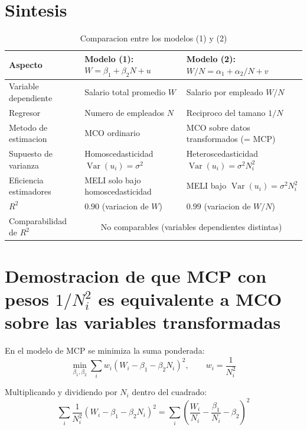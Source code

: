\documentclass[12pt, letterpaper]{article}
\theoremstyle{remark}
\newcommand{\Var}{\operatorname{Var}}
\begin{document}
\section{Sintesis}

\begin{table}[ht]
\centering
\caption{Comparacion entre los modelos (1) y (2)}
\label{tab:comparacion}
\small
\begin{tabular}{p{3.5cm} p{5cm} p{5cm}}
\toprule
\textbf{Aspecto}
  & \textbf{Modelo (1): $W = \beta_1 + \beta_2 N + u$}
  & \textbf{Modelo (2): $W/N = \alpha_1 + \alpha_2/N + v$} \\
\midrule
Variable dependiente
  & Salario total promedio $W$
  & Salario por empleado $W/N$ \\[4pt]
Regresor
  & Numero de empleados $N$
  & Reciproco del tamano $1/N$ \\[4pt]
Metodo de estimacion
  & MCO ordinario
  & MCO sobre datos transformados (= MCP) \\[4pt]
Supuesto de varianza
  & Homoscedasticidad $\Var(u_i) = \sigma^2$
  & Heteroscedasticidad $\Var(u_i) = \sigma^2 N_i^2$ \\[4pt]
Eficiencia estimadores
  & MELI solo bajo homoscedasticidad
  & MELI bajo $\Var(u_i) = \sigma^2 N_i^2$ \\[4pt]
$R^2$
  & $0.90$ (variacion de $W$)
  & $0.99$ (variacion de $W/N$) \\[4pt]
Comparabilidad de $R^2$
  & \multicolumn{2}{c}{No comparables (variables dependientes distintas)} \\
\bottomrule
\end{tabular}
\end{table}

\appendix

\section{Demostracion de que MCP con pesos $1/N_i^2$ es equivalente a MCO sobre las variables transformadas}

En el modelo de MCP se minimiza la suma ponderada:
\begin{equation}
  \min_{\beta_1,\beta_2} \sum_i w_i (W_i - \beta_1 - \beta_2 N_i)^2,
  \qquad w_i = \frac{1}{N_i^2}
  \label{eq:MCP}
\end{equation}

Multiplicando y dividiendo por $N_i$ dentro del cuadrado:
\begin{equation}
  \sum_i \frac{1}{N_i^2}(W_i - \beta_1 - \beta_2 N_i)^2
  = \sum_i \left(\frac{W_i}{N_i} - \frac{\beta_1}{N_i} - \beta_2\right)^2
  \label{eq:MCP_equiv}
\end{equation}
\end{document}
